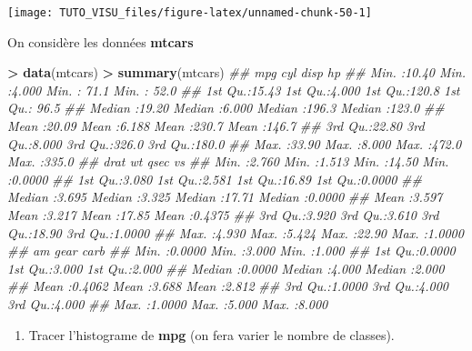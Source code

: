 \documentclass[]{book}
\newenvironment{Shaded}{\begin{snugshade}}{\end{snugshade}}
\newcommand{\CommentTok}[1]{\textcolor[rgb]{0.56,0.35,0.01}{\textit{#1}}}
\newcommand{\KeywordTok}[1]{\textcolor[rgb]{0.13,0.29,0.53}{\textbf{#1}}}
\newcommand{\NormalTok}[1]{#1}
\newcommand{\OperatorTok}[1]{\textcolor[rgb]{0.81,0.36,0.00}{\textbf{#1}}}
\newcommand{\StringTok}[1]{\textcolor[rgb]{0.31,0.60,0.02}{#1}}
\providecommand{\tightlist}{%
  \setlength{\itemsep}{0pt}\setlength{\parskip}{0pt}}
\theoremstyle{definition}
\theoremstyle{definition}
\theoremstyle{definition}
\theoremstyle{remark}
\let\BeginKnitrBlock\begin \let\EndKnitrBlock\end
\begin{document}
\begin{center}\texttt{[image: TUTO\_VISU\_files/figure-latex/unnamed-chunk-50-1]} \end{center}

\BeginKnitrBlock{exercise}[Différents graphes]
\protect\hypertarget{exr:exo-mtcars}{}{\label{exr:exo-mtcars} \iffalse (Différents graphes) \fi{} }
\EndKnitrBlock{exercise}

On considère les données \textbf{mtcars}

\begin{Shaded}
\begin{Highlighting}[]
\OperatorTok{>}\StringTok{ }\KeywordTok{data}\NormalTok{(mtcars)}
\OperatorTok{>}\StringTok{ }\KeywordTok{summary}\NormalTok{(mtcars)}
\CommentTok{##       mpg             cyl             disp             hp       }
\CommentTok{##  Min.   :10.40   Min.   :4.000   Min.   : 71.1   Min.   : 52.0  }
\CommentTok{##  1st Qu.:15.43   1st Qu.:4.000   1st Qu.:120.8   1st Qu.: 96.5  }
\CommentTok{##  Median :19.20   Median :6.000   Median :196.3   Median :123.0  }
\CommentTok{##  Mean   :20.09   Mean   :6.188   Mean   :230.7   Mean   :146.7  }
\CommentTok{##  3rd Qu.:22.80   3rd Qu.:8.000   3rd Qu.:326.0   3rd Qu.:180.0  }
\CommentTok{##  Max.   :33.90   Max.   :8.000   Max.   :472.0   Max.   :335.0  }
\CommentTok{##       drat             wt             qsec             vs        }
\CommentTok{##  Min.   :2.760   Min.   :1.513   Min.   :14.50   Min.   :0.0000  }
\CommentTok{##  1st Qu.:3.080   1st Qu.:2.581   1st Qu.:16.89   1st Qu.:0.0000  }
\CommentTok{##  Median :3.695   Median :3.325   Median :17.71   Median :0.0000  }
\CommentTok{##  Mean   :3.597   Mean   :3.217   Mean   :17.85   Mean   :0.4375  }
\CommentTok{##  3rd Qu.:3.920   3rd Qu.:3.610   3rd Qu.:18.90   3rd Qu.:1.0000  }
\CommentTok{##  Max.   :4.930   Max.   :5.424   Max.   :22.90   Max.   :1.0000  }
\CommentTok{##        am              gear            carb      }
\CommentTok{##  Min.   :0.0000   Min.   :3.000   Min.   :1.000  }
\CommentTok{##  1st Qu.:0.0000   1st Qu.:3.000   1st Qu.:2.000  }
\CommentTok{##  Median :0.0000   Median :4.000   Median :2.000  }
\CommentTok{##  Mean   :0.4062   Mean   :3.688   Mean   :2.812  }
\CommentTok{##  3rd Qu.:1.0000   3rd Qu.:4.000   3rd Qu.:4.000  }
\CommentTok{##  Max.   :1.0000   Max.   :5.000   Max.   :8.000}
\end{Highlighting}
\end{Shaded}

\begin{enumerate}
\def\labelenumi{\arabic{enumi}.}
\tightlist
\item
  Tracer l'histograme de \textbf{mpg} (on fera varier le nombre de classes).
\end{enumerate}
\end{document}

